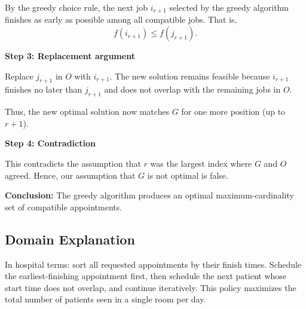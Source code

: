 \documentclass[conference]{IEEEtran}
\begin{document}
By the greedy choice rule, the next job $i_{r+1}$ selected by the greedy algorithm finishes as early as possible among all compatible jobs. That is,
\[
f(i_{r+1}) \le f(j_{r+1}).
\]  

\textbf{Step 3: Replacement argument}  

Replace $j_{r+1}$ in $O$ with $i_{r+1}$. The new solution remains feasible because $i_{r+1}$ finishes no later than $j_{r+1}$ and does not overlap with the remaining jobs in $O$.  

Thus, the new optimal solution now matches $G$ for one more position (up to $r+1$).  

\textbf{Step 4: Contradiction}  

This contradicts the assumption that $r$ was the largest index where $G$ and $O$ agreed. Hence, our assumption that $G$ is not optimal is false.  

\textbf{Conclusion:} The greedy algorithm produces an optimal maximum-cardinality set of compatible appointments.  

\subsection{Domain Explanation}
In hospital terms: sort all requested appointments by their finish times. Schedule the earliest-finishing appointment first, then schedule the next patient whose start time does not overlap, and continue iteratively. This policy maximizes the total number of patients seen in a single room per day.  
\end{document}
